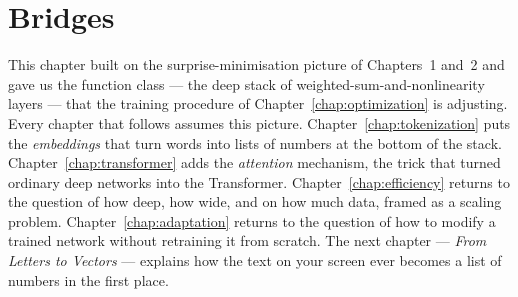 \section*{Bridges}

This chapter built on the surprise-minimisation picture of
Chapters~1 and~2 and gave us the function class --- the deep
stack of weighted-sum-and-nonlinearity layers --- that the
training procedure of Chapter~\ref{chap:optimization} is adjusting. Every chapter
that follows assumes this picture. Chapter~\ref{chap:tokenization} puts the
\emph{embeddings} that turn words into lists of numbers at the
bottom of the stack. Chapter~\ref{chap:transformer} adds the \emph{attention}
mechanism, the trick that turned ordinary deep networks into
the Transformer. Chapter~\ref{chap:efficiency} returns to the question of how
deep, how wide, and on how much data, framed as a scaling
problem. Chapter~\ref{chap:adaptation} returns to the question of how to modify a
trained network without retraining it from scratch. The next
chapter --- \emph{From Letters to Vectors} --- explains how the
text on your screen ever becomes a list of numbers in the first
place.
